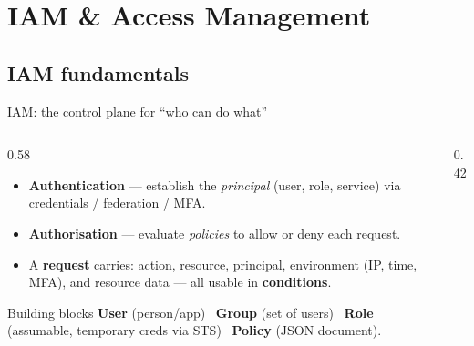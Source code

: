 \documentclass[aspectratio=169,10pt]{beamer}
\newcommand{\term}[1]{{\color{awsink}\textbf{#1}}}
\begin{document}
\section{IAM \& Access Management}

\subsection{IAM fundamentals}

\begin{frame}{IAM: the control plane for ``who can do what''}
  \begin{columns}[T]
    \begin{column}{0.58\textwidth}\small
      \begin{itemize}
        \item \term{Authentication} --- establish the \emph{principal} (user, role, service)
              via credentials / federation / MFA.
        \item \term{Authorisation} --- evaluate \emph{policies} to allow or deny each request.
        \item A \term{request} carries: action, resource, principal, environment (IP, time, MFA),
              and resource data --- all usable in \term{conditions}.
      \end{itemize}
      \begin{block}{\footnotesize Building blocks}
        \footnotesize \term{User} (person/app) \textbullet\ \term{Group} (set of users) \textbullet\
        \term{Role} (assumable, temporary creds via STS) \textbullet\ \term{Policy} (JSON document).
      \end{block}
    \end{column}
    \begin{column}{0.42\textwidth}
      \centering
    \end{column}
  \end{columns}
\end{frame}
\end{document}
